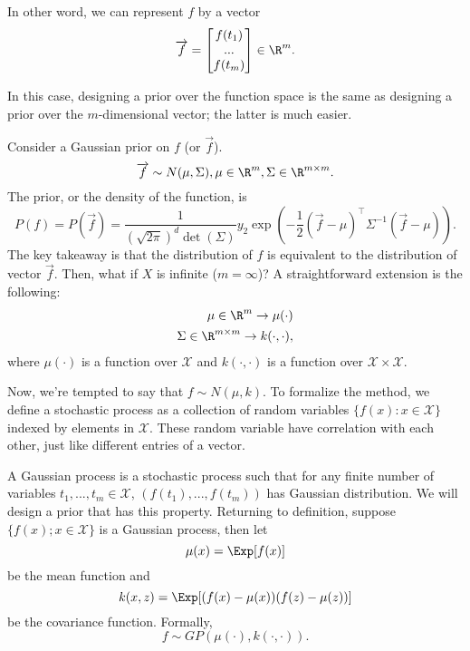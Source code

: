 In other word, we can represent $f$ by a vector 
\begin{equation*} \label{eu_eqn}
	\overrightarrow{f} = 
	\begin{bmatrix}
		f(t_1)\\
		...\\
		f(t_m)\\
	\end{bmatrix}
	\in \R^m.
\end{equation*}

In this case, designing a prior over the function space is the same as designing a prior over the $m$-dimensional vector; the latter is much easier. 

Consider a Gaussian prior on $f$ (or $\overrightarrow{f}$). 
\begin{equation*} \label{eu_eqn}
	\overrightarrow{f} \sim N(\mu, \Sigma), \mu \in \R^m, \Sigma \in \R^{m \times m}.
\end{equation*}
The prior, or the density of the function, is
\begin{equation*} \label{eu_eqn}
	P(f) = P(\overrightarrow{f}) = \frac{1}{(\sqrt{2\pi})^d \det(\Sigma)} y_2 \exp(-\frac{1}{2}(\overrightarrow{f} - \mu)^\top \Sigma^{-1}(\overrightarrow{f} - \mu)).
\end{equation*}
The key takeaway is that the distribution of $f$ is equivalent to the distribution of vector $\overrightarrow{f}$. Then, what if $X$ is infinite ($m = \infty$)? A straightforward extension is the following: 
\begin{equation*} \label{eq1}
	\begin{split}
		\mu \in \R^m \rightarrow \mu(\cdot) \\
		\Sigma \in \R^{m \times m} \rightarrow k(\cdot, \cdot), \\
	\end{split}
\end{equation*}
where $\mu(\cdot)$ is a function over $\mathcal{X}$ and $k(\cdot, \cdot)$ is a function over $\mathcal{X} \times \mathcal{X}$. 

Now, we're tempted to say that $f \sim N(\mu, k)$. To formalize the method, we define a stochastic process as a collection of random variables $\{f(x): x \in \mathcal{X}\}$ indexed by elements in $\mathcal{X}$. These random variable have correlation with each other, just like different entries of a vector. 

A Gaussian process is a stochastic process such that for any finite number of variables $t_1, ..., t_m \in \mathcal{X}$, $(f(t_1), ..., f(t_m))$ has Gaussian distribution. We will design a prior that has this property. Returning to definition, suppose $\{f(x); x \in \mathcal{X}\}$ is a Gaussian process, then let \begin{equation*} \label{eu_eqn}
	\mu(x) = \Exp[f(x)]
\end{equation*}
be the mean function and 
\begin{equation*} \label{eu_eqn}
	k(x, z) = \Exp[(f(x) - \mu(x))(f(z) - \mu(z))]
\end{equation*}
be the covariance function. Formally, 
\begin{equation} \label{eu_eqn}
	f \sim GP(\mu(\cdot), k(\cdot, \cdot)).
\end{equation}

